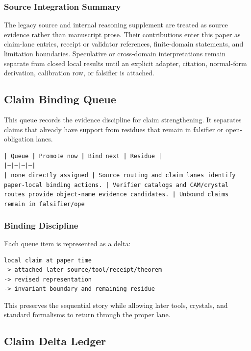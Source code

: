 \documentclass[11pt]{article}
\begin{document}
\subsubsection*{Source Integration Summary}

The legacy source and internal reasoning supplement are treated as source
evidence rather than manuscript prose. Their contributions enter this paper as
claim-lane entries, receipt or validator references, finite-domain statements,
and limitation boundaries. Speculative or cross-domain interpretations remain
separate from closed local results until an explicit adapter, citation,
normal-form derivation, calibration row, or falsifier is attached.
\subsection*{Claim Binding Queue}

This queue records the evidence discipline for claim strengthening. It separates claims that already have support from residues that remain in falsifier or open-obligation lanes.

\noindent\texttt{| Queue | Promote now | Bind next | Residue |}\\
\noindent\texttt{|---|---|---|---|}\\
\noindent\texttt{| none directly assigned | Source routing and claim lanes identify paper-local binding actions. | Verifier catalogs and CAM/crystal routes provide object-name evidence candidates. | Unbound claims remain in falsifier/ope}\\

\subsubsection*{Binding Discipline}

Each queue item is represented as a delta:

\begin{verbatim}
local claim at paper time
-> attached later source/tool/receipt/theorem
-> revised representation
-> invariant boundary and remaining residue
\end{verbatim}

This preserves the sequential story while allowing later tools, crystals, and
standard formalisms to return through the proper lane.

\subsection*{Claim Delta Ledger}
\end{document}
